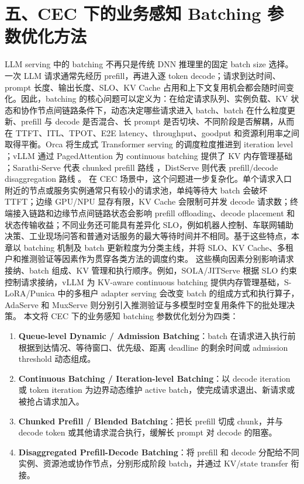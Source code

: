 \clearpage
{}
\section*{五、CEC 下的业务感知 Batching 参数优化方法}

LLM serving 中的 batching 不再只是传统 DNN 推理里的固定 batch size 选择。一次 LLM 请求通常先经历 prefill，再进入逐 token decode；请求到达时间、prompt 长度、输出长度、SLO、KV Cache 占用和上下文复用机会都会随时间变化。因此，batching 的核心问题可以定义为：在给定请求队列、实例负载、KV 状态和协作节点间链路条件下，动态决定哪些请求进入 batch、batch 在什么粒度更新、prefill 与 decode 是否混合、长 prompt 是否切块、不同阶段是否解耦，从而在 TTFT、ITL、TPOT、E2E latency、throughput、goodput 和资源利用率之间取得平衡。Orca 将生成式 Transformer serving 的调度粒度推进到 iteration level \cite{yu2022orca}；vLLM 通过 PagedAttention 为 continuous batching 提供了 KV 内存管理基础 \cite{kwon2023efficient}；Sarathi-Serve 代表 chunked prefill 路线 \cite{agrawal2024taming}，DistServe 则代表 prefill/decode disaggregation 路线 \cite{zhong2024distserve}。
在 CEC 场景中，这个问题进一步复杂化。单个请求入口附近的节点或服务实例通常只有较小的请求池，单纯等待大 batch 会破坏 TTFT；边缘 GPU/NPU 显存有限，KV Cache 会限制可并发 decode 请求数；终端接入链路和边缘节点间链路状态会影响 prefill offloading、decode placement 和状态传输收益；不同业务还可能具有差异化 SLO，例如机器人控制、车联网辅助决策、工业现场问答和普通对话服务的最大等待时间并不相同。基于这些特点，本章以 batching 机制及 batch 更新粒度为分类主线，并将 SLO、KV Cache、多租户和推测验证等因素作为贯穿各类方法的调度约束。
这些横向因素分别影响请求接纳、batch 组成、KV 管理和执行顺序。例如，SOLA/JITServe 根据 SLO 约束控制请求接纳，vLLM 为 KV-aware continuous batching 提供内存管理基础，S-LoRA/Punica 中的多租户 adapter serving 会改变 batch 的组成方式和执行算子，AdaServe 和 MuxServe 则分别引入推测验证与多模型时空复用条件下的批处理决策。
本文将 CEC 下的业务感知 batching 参数优化划分为四类：
\begin{enumerate}
\item \textbf{Queue-level Dynamic / Admission Batching}：batch 在请求进入执行前根据到达情况、等待窗口、优先级、距离 deadline 的剩余时间或 admission threshold 动态组成。
\item \textbf{Continuous Batching / Iteration-level Batching}：以 decode iteration 或 token iteration 为边界动态维护 active batch，使完成请求退出、新请求或被抢占请求加入。
\item \textbf{Chunked Prefill / Blended Batching}：把长 prefill 切成 chunk，并与 decode token 或其他请求混合执行，缓解长 prompt 对 decode 的阻塞。
\item \textbf{Disaggregated Prefill-Decode Batching}：将 prefill 和 decode 分配给不同实例、资源池或协作节点，分别形成阶段 batch，并通过 KV/state transfer 衔接。
\end{enumerate}

